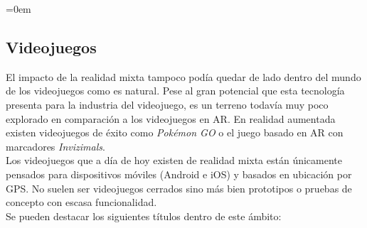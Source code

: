 \parindent=0em
\subsection{Videojuegos}
\noindent

El impacto de la realidad mixta tampoco podía quedar de lado dentro del mundo de los videojuegos como es natural. Pese al gran potencial que esta tecnología presenta para la industria del videojuego, es un terreno todavía muy poco explorado en comparación a los videojuegos en AR. En realidad aumentada existen videojuegos de éxito como \textit{Pokémon GO} o el juego basado en AR con marcadores \textit{Invizimals}. \\

Los videojuegos que a día de hoy existen de realidad mixta están únicamente pensados para dispositivos móviles (Android e iOS) y basados en ubicación por GPS. No suelen ser videojuegos cerrados sino más bien prototipos o pruebas de concepto con escasa funcionalidad. \\

Se pueden destacar los siguientes títulos dentro de este ámbito:

